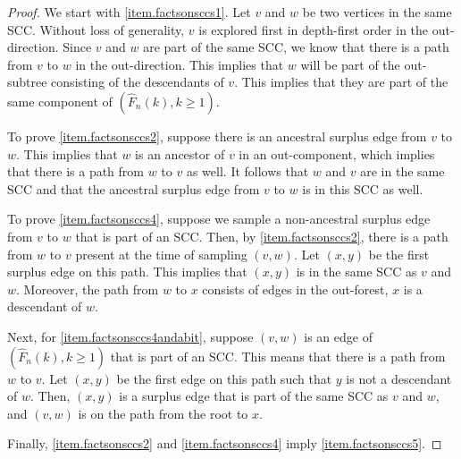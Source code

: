 \begin{proof}
We start with \ref{item.factsonsccs1}. Let $v$ and $w$ be two vertices in the same SCC. Without loss of generality, $v$ is explored first in depth-first order in the out-direction. Since $v$ and $w$ are part of the same SCC, we know that there is a path from $v$ to $w$ in the out-direction. This implies that $w$ will be part of the out-subtree consisting of the descendants of $v$. This implies that they are part of the same component of $(\hat{F}_n(k),k\geq 1)$.

To prove \ref{item.factsonsccs2}, suppose there is an ancestral surplus edge from $v$ to $w$. This implies that $w$ is an ancestor of $v$ in an out-component, which implies that there is a path from $w$ to $v$ as well. It follows that $w$ and $v$ are in the same SCC and that the ancestral surplus edge from $v$ to $w$ is in this SCC as well. 

To prove \ref{item.factsonsccs4}, suppose we sample a non-ancestral surplus edge from $v$ to $w$ that is part of an SCC. Then, by \ref{item.factsonsccs2}, there is a path from $w$ to $v$ present at the time of sampling $(v,w)$. Let $(x,y)$ be the first surplus edge on this path. This implies that $(x,y)$ is in the same SCC as $v$ and $w$. Moreover, the path from $w$ to $x$ consists of edges in the out-forest, $x$ is a descendant of $w$.

Next, for \ref{item.factsonsccs4andabit}, suppose $(v,w)$ is an edge of $(\hat{F}_n(k),k\geq 1)$ that is part of an SCC. This means that there is a path from $w$ to $v$. Let $(x,y)$ be the first edge on this path such that $y$ is not a descendant of $w$. Then, $(x,y)$ is a surplus edge that is part of the same SCC as $v$ and $w$, and $(v,w)$ is on the path from the root to $x$. 

Finally, \ref{item.factsonsccs2} and \ref{item.factsonsccs4} imply \ref{item.factsonsccs5}. 
\end{proof}

